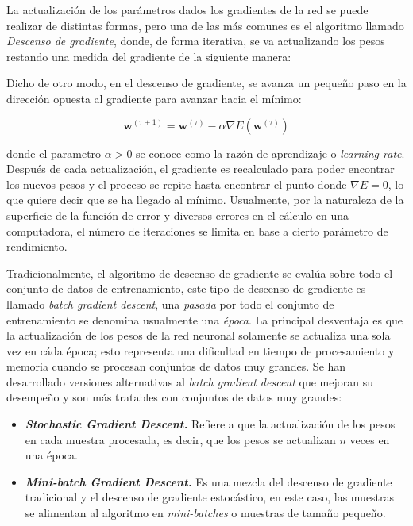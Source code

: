             La actualización de los parámetros dados los gradientes de la red se puede realizar de distintas formas, pero una 
            de las más comunes es el algoritmo llamado \textit{Descenso de gradiente}, donde, de forma iterativa, se 
            va actualizando los pesos restando una medida del gradiente de la siguiente manera:

            Dicho de otro modo, en el descenso de gradiente, se avanza un pequeño paso en la dirección opuesta al gradiente 
            para avanzar hacia el mínimo:

            \begin{equation}
                \mathbf{w}^{(\tau + 1)} = \mathbf{w}^{(\tau)} - \alpha \nabla E(\mathbf{w}^{(\tau)})
            \end{equation}

            donde el parametro $\alpha > 0$ se conoce como la razón de aprendizaje o \textit{learning rate}. Después de 
            cada actualización, el gradiente es recalculado para poder encontrar los nuevos pesos y el proceso se repite 
            hasta encontrar el punto donde $\nabla E = 0$, lo que quiere decir que se ha llegado al mínimo. Usualmente, por 
            la naturaleza de la superficie de la función de error y diversos errores en el cálculo en una computadora, el número 
            de iteraciones se limita en base a cierto parámetro de rendimiento.

            Tradicionalmente, el algoritmo de descenso de gradiente se evalúa sobre todo el conjunto de datos de entrenamiento, 
            este tipo de descenso de gradiente es llamado \textit{batch gradient descent}, una \textit{pasada} por todo el conjunto 
            de entrenamiento se denomina usualmente una \textit{época}. La principal desventaja es que la 
            actualización de los pesos de la red neuronal solamente se actualiza una sola vez en cáda época; esto representa una 
            dificultad en tiempo de procesamiento y memoria cuando se procesan conjuntos de datos muy grandes. Se han desarrollado 
            versiones alternativas al \textit{batch gradient descent} que mejoran su desempeño y son más tratables con 
            conjuntos de datos muy grandes:

            \begin{itemize}
                \item \textbf{\textit{Stochastic Gradient Descent.}} Refiere a que la actualización de los pesos en cada muestra procesada, es decir, que los pesos se actualizan $n$ veces en una época.
                \item \textbf{\textit{Mini-batch Gradient Descent.}} Es una mezcla del descenso de gradiente tradicional y el descenso de gradiente estocástico, en este caso, las muestras se alimentan al algoritmo en \textit{mini-batches} o muestras de tamaño pequeño.
            \end{itemize}
        
